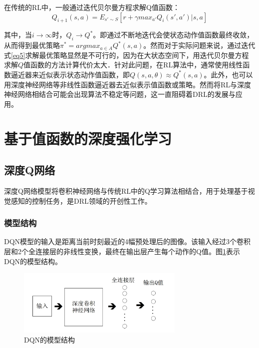 \documentclass[bachelor]{thesis-uestc}
\begin{document}
	在传统的RL中，一般通过迭代贝尔曼方程求解Q值函数：
	\begin{equation}
	\label{eq5}
	Q_{i+1}(s,a)=E_{s'\sim S}[r+\gamma max_{a'}Q_i(s',a')|s,a]
	\end{equation}
	
	其中，当$i\rightarrow\infty$时，$Q_i\rightarrow Q^*$。即通过不断地迭代会使状态动作值函数最终收敛，从而得到最优策略$\pi^*=argmax_{a\in A}Q^*(s,a)$。然而对于实际问题来说，通过迭代式\ref{eq5}求解最优策略显然是不可行的，因为在大状态空间下，用迭代贝尔曼方程求解$Q$值函数的方法计算代价太大．针对此问题，在RL算法中，通常使用线性函数逼近器来近似表示状态动作值函数，即$Q(s,a,\theta)\approx Q^*(s,a)$。此外，也可以用深度神经网络等非线性函数逼近器去近似表示值函数或策略。然而将RL与深度神经网络相结合可能会出现算法不稳定\cite{tsitsiklis1996analysis}等问题，这一直阻碍着DRL的发展与应用。
	
	\section{基于值函数的深度强化学习}
	\subsection{深度Q网络}
	深度Q网络模型将卷积神经网络与传统RL中的Q学习算法相结合，用于处理基于视觉感知的控制任务，是DRL领域的开创性工作。
	
	\subsubsection{模型结构}
	DQN模型的输入是距离当前时刻最近的4幅预处理后的图像。该输入经过3个卷积层和2个全连接层的非线性变换，最终在输出层产生每个动作的Q值。图\ref{fg1}表示DQN的模型结构。
	\begin{figure}
		\includegraphics[width=8cm]{./pic/fg1.jpg}
		\caption{DQN的模型结构}
		\label{fg1}
	\end{figure}
	
\end{document}
